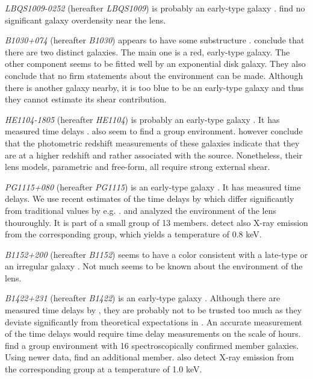 \documentclass[useAMS,usenatbib]{mn2e}
\begin{document}
\textit{LBQS1009-0252} (hereafter \textit{LBQS1009}) is probably an early-type galaxy \citep{2000ApJ...536..584L}. \cite{2004A&A...428..741F} find no significant galaxy overdensity near the lens.

\textit{B1030+074} (hereafter \textit{B1030}) appears to have some substructure \citep{1998MNRAS.300..649X}. \cite{2000ApJ...536..584L} conclude that there are two distinct galaxies. The main one is a red, early-type galaxy. The other component seems to be fitted well by an exponential disk galaxy. They also conclude that no firm statements about the environment can be made. Although there is another galaxy nearby, it is too blue to be an early-type galaxy and thus they cannot estimate its shear contribution.

\textit{HE1104-1805} (hereafter \textit{HE1104}) is probably an early-type galaxy \citep{2000ApJ...536..584L,2000A&A...360..853C}. It has measured time delays \citep{2008ApJ...676...80M}. \cite{2000ApJ...536..584L} also seem to find a group environment. \cite{2004A&A...428..741F} however conclude that the photometric redshift measurements of these galaxies indicate that they are at a higher redshift and rather associated with the source. Nonetheless, their lens models, parametric and free-form, all require strong external shear.

\textit{PG1115+080} (hereafter \textit{PG1115}) is an early-type galaxy \citep{2005ApJ...626...51Y}. It has measured time delays. We use recent estimates of the time delays by \cite{2010MNRAS.406.2764T} which differ significantly from traditional values by e.g. \cite{1997ApJ...489...21B}. \cite{2006ApJ...641..169M} and \cite{2011ApJ...726...84W} analyzed the environment of the lens thouroughly. It is part of a small group of 13 members. \cite{2004ApJ...610..686G} detect also X-ray emission from the corresponding group, which yields a temperature of 0.8 keV.

\textit{B1152+200} (hereafter \textit{B1152}) seems to have a color consistent with a late-type or an irregular galaxy \citep{2000A&A...357..115T}. Not much seems to be known about the environment of the lens.

\textit{B1422+231} (hereafter \textit{B1422}) is an early-type galaxy \citep{1996ApJ...462L..53I}. Although there are measured time delays by \cite{2001MNRAS.326.1403P}, they are probably not to be trusted too much as they deviate significantly from theoretical expectations in \cite{2003AJ....126...29R}. An accurate measurement of the time delays would require time delay measurements on the scale of hours. \cite{2006ApJ...641..169M} find a group environment with 16 spectroscopically confirmed member galaxies. Using newer data, \cite{2011ApJ...726...84W} find an additional member. \cite{2004ApJ...610..686G} also detect X-ray emission from the corresponding group at a temperature of 1.0 keV.
\end{document}

